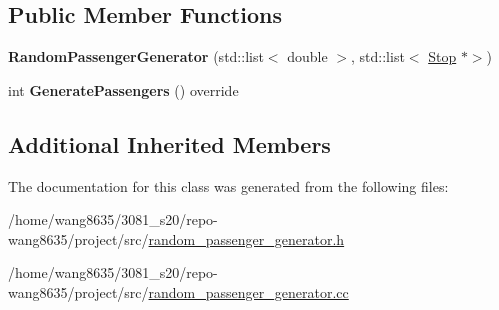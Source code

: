\subsection*{Public Member Functions}
\begin{DoxyCompactItemize}
\item 
\mbox{\label{classRandomPassengerGenerator_a1be1b4abfe82bfe95eb0a078d9a3342d}} 
{\bfseries Random\+Passenger\+Generator} (std\+::list$<$ double $>$, std\+::list$<$ \hyperlink{classStop}{Stop} $\ast$$>$)
\item 
\mbox{\label{classRandomPassengerGenerator_aba2d80cde33371cf9c3d033f1b8ba6b8}} 
int {\bfseries Generate\+Passengers} () override
\end{DoxyCompactItemize}
\subsection*{Additional Inherited Members}


The documentation for this class was generated from the following files\+:\begin{DoxyCompactItemize}
\item 
/home/wang8635/3081\+\_\+s20/repo-\/wang8635/project/src/\hyperlink{random__passenger__generator_8h}{random\+\_\+passenger\+\_\+generator.\+h}\item 
/home/wang8635/3081\+\_\+s20/repo-\/wang8635/project/src/\hyperlink{random__passenger__generator_8cc}{random\+\_\+passenger\+\_\+generator.\+cc}\end{DoxyCompactItemize}
